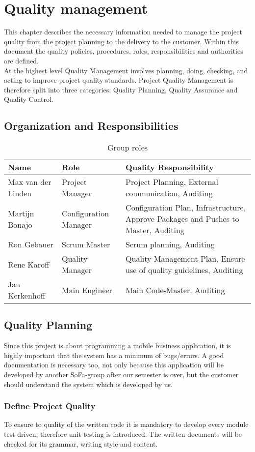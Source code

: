 \section{Quality management}
This chapter describes the necessary information needed to manage the project quality from the project planning to the delivery
to the customer. Within this document the quality policies, procedures, roles, responsibilities and authorities are defined.\\
At the highest level Quality Management involves planning, doing, checking, and acting to improve project quality standards. Project Quality Management is therefore split into three categories: Quality Planning, Quality Assurance and Quality Control.
\subsection{Organization and Responsibilities}
\begin{table}[htbp]
	\begin{tabular}{ p{4cm} p{} p{} }
		\textbf{Name} & \textbf{Role} & \textbf{Quality Responsibility} \\ \hline
		Max van der Linden & Project Manager & Project Planning, External communication, Auditing \\ 
		Martijn Bonajo & Configuration Manager & Configuration Plan, Infrastructure, Approve Packages and Pushes to Master, Auditing \\ 
		Ron Gebauer & Scrum Master & Scrum planning, Auditing \\ 
		Rene Karoff & Quality Manager & Quality Management Plan, Ensure use of quality guidelines, Auditing \\ 
		Jan Kerkenhoff & Main Engineer & Main Code-Master, Auditing \\
	\end{tabular}
	\caption{Group roles\label{tab:GroupRoles}}
\end{table}
\subsection{Quality Planning}
Since this project is about programming a mobile business application, it is highly important that the system has a minimum of bugs/errors. A good documentation is necessary too, not only because this application will be developed by another SoFa-group after our semester is over, but the customer should understand the system which is developed by us.
\subsubsection{Define Project Quality}
To ensure to quality of the written code it is mandatory to develop every module test-driven, therefore unit-testing is introduced. The written documents will be checked for its grammar, writing style and content.

